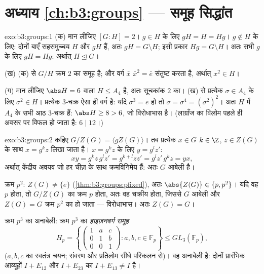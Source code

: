 \section*{अध्याय \ref{ch:b3:groups} --- समूह सिद्धांत}

\begin{solution}{exo:b3:groups:1}
(क) मान लीजिए $[G:H] = 2$। $g \in H$ के लिए $gH = H = Hg$। $g \notin
H$ के लिए: दोनों बाएँ सहसमुच्चय
$H$ और $gH$ हैं, अतः $gH = G \setminus H$; इसी प्रकार $Hg = G \setminus H$। अतः सभी $g$ के लिए $gH = Hg$:
अर्थात् $H
\trianglelefteq G$।

(ख) (क) से $G/H$ क्रम $2$ का समूह है; और वर्ग $\bar x$ $\bar x^2 = \bar e$ संतुष्ट
करता है, अर्थात् $x^2 \in H$।

(ग) मान लीजिए $\abs H = 6$ वाला $H \leq A_4$ है, अतः सूचकांक $2$ का। (ख) से
प्रत्येक $\sigma \in A_4$ के लिए $\sigma^2 \in H$। प्रत्येक $3$-चक्र ऐसा ही वर्ग है: यदि
$\sigma^3 = e$ हो तो $\sigma =
\sigma^4 = (\sigma^2)^2$। अतः $H$ में $A_4$ के सभी आठ $3$-चक्र हैं: $\abs H \geq 8 > 6$,
जो विरोधाभास है। (लाग्राँज का विलोम पहले ही अवसर पर विफल हो जाता
है: $6 \mid 12$।)
\end{solution}

\begin{solution}{exo:b3:groups:2}
कहिए $G/Z(G) = \langle gZ(G) \rangle$। तब प्रत्येक $x \in G$ $k \in \Z$, $z \in Z(G)$ के साथ $x = g^k z$ लिखा जाता है।
$x = g^kz$ के लिए $y =
g^l z'$:
\[
xy = g^k z\, g^l z' = g^{k+l} z z' = g^l z'\, g^k z = yx,
\]
अर्थात् केंद्रीय अवयव जो हर चीज़ के साथ क्रमविनिमेय हैं: अतः $G$
आबेली है।

क्रम $p^2$: $Z(G) \neq \{e\}$ (\cref{thm:b3:groups:pfixed}), अतः $\abs{Z(G)} \in \{p, p^2\}$। यदि वह $p$ होता, तो $G/Z(G)$ का क्रम
$p$ होता, अतः वह चक्रीय होता, जिससे $G$ आबेली और $Z(G) =
G$ क्रम $p^2$
का हो जाता --- विरोधाभास। अतः $Z(G) = G$।

क्रम $p^3$ का अनाबेली: क्रम $p^3$ का \emph{हाइज़नबर्ग समूह}
\[
H_p = \left\{ \begin{pmatrix} 1 & a & c\\ 0 & 1 & b\\ 0 & 0 & 1
\end{pmatrix} : a, b, c \in \mathbb F_p \right\}
\leq GL_3(\mathbb F_p),
\]
($a, b, c$ का स्वतंत्र चयन; संवरण और प्रतिलोम सीधे परिकलन से)। वह अनाबेली
है: दोनों प्रारंभिक आव्यूहों $I + E_{12}$ और $I + E_{23}$ का  $I + E_{13} \neq I$ है।
\end{solution}

